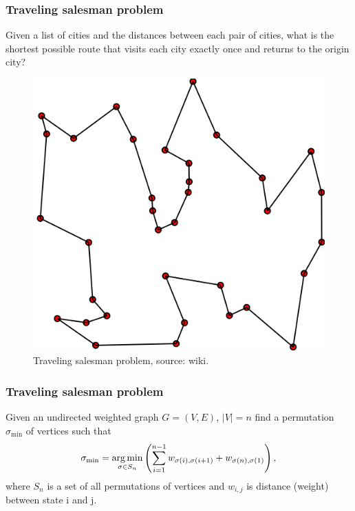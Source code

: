 \begin{frame}
	\frametitle{Traveling salesman problem}
	\begin{definition}[TSP]
		Given a list of cities and the distances between each pair of cities, what is the shortest possible route that visits each city exactly once and returns to the origin city?
	\end{definition}
	\begin{figure}
		\centering
		\includegraphics[scale=0.13]{img/travelling_salesman_problem}
		\caption{Traveling salesman problem, source: wiki.}
	\end{figure}
\end{frame}

\begin{frame}
	\frametitle{Traveling salesman problem}
	\begin{definition}
		Given an undirected weighted graph $G = (V, E)$, $|V| = n$ find a permutation $\sigma_{\min}$ of vertices such that
		\begin{equation*}
		\sigma_{\min} = \underset{\sigma \in S_n}{\operatorname*{arg\,min}} \left( \sum_{i=1}^{n-1} w_{\sigma(i), \sigma(i+1)} + w_{\sigma(n), \sigma(1)} \right),
		\end{equation*}
		where $S_n$ is a set of all permutations of vertices and $w_{i,j}$ is distance (weight) between state i and j.
	\end{definition}
\end{frame}
